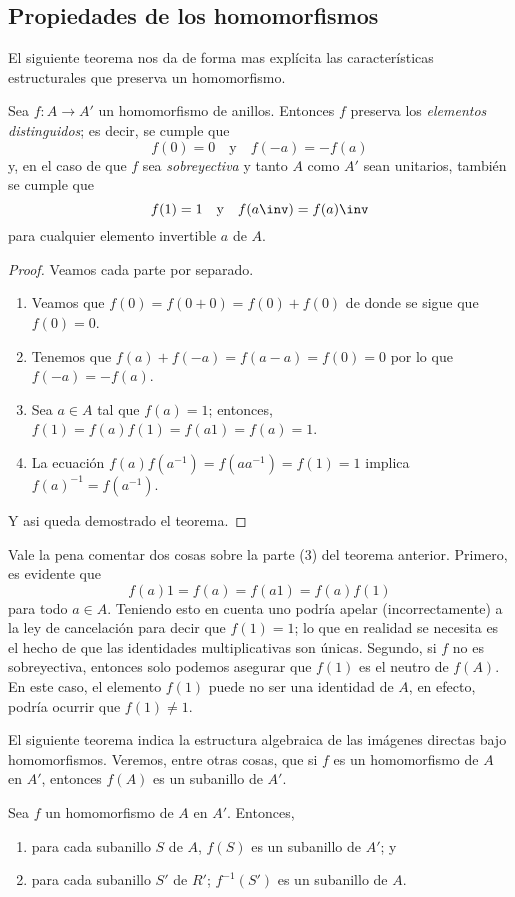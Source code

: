 \subsection{Propiedades de los homomorfismos}
El siguiente teorema nos da de forma mas explícita las características estructurales que preserva un homomorfismo.
\begin{teo} 
	Sea $f\colon A\to A'$ un homomorfismo de anillos. Entonces $f$ preserva los \textit{elementos distinguidos}; es decir, se cumple que
	\[ f(0) = 0 \quad \text{y} \quad f(-a) = -f(a)  \]
	y, en el caso de que $f$ sea \textit{sobreyectiva} y tanto $A$ como $A'$ sean unitarios, también se cumple que
	\[ f(1) = 1 \quad \text{y} \quad f(a\inv) = f(a)\inv \]
	para cualquier elemento invertible $a$ de $A$.
\end{teo} 
\begin{proof}

	Veamos cada parte por separado.
	\begin{enumerate} 
		\item Veamos que $f(0) = f(0+0) = f(0) + f(0)$ de donde se sigue que $f(0) = 0$.
		\item Tenemos que $f(a) + f(-a) = f(a-a) = f(0) = 0$ por lo que $f(-a) = -f(a)$.
		\item Sea $a\in A$ tal que $f(a)=1$; entonces, $f(1) = f(a)f(1) = f(a1) = f(a) = 1$.
		\item La ecuación $f(a)f(a^{-1}) = f(aa^{-1}) = f(1) = 1$ implica $f(a)^{-1} = f(a^{-1})$. 
	\end{enumerate}
	Y asi queda demostrado el teorema.
\end{proof}
Vale la pena comentar dos cosas sobre la parte (3) del teorema anterior. Primero, es evidente que
\[ f(a)1 = f(a) = f(a1) = f(a)f(1) \]
para todo $a\in A$. Teniendo esto en cuenta uno podría apelar (incorrectamente) a la ley de cancelación para decir que $f(1)=1$; lo que en realidad se necesita es el hecho de que las identidades multiplicativas son únicas. Segundo, si $f$ no es sobreyectiva, entonces solo podemos asegurar que $f(1)$ es el neutro de $f(A)$. En este caso, el elemento $f(1)$ puede no ser una identidad de $A$, en efecto, podría ocurrir que $f(1)\neq 1$.

El siguiente teorema indica la estructura algebraica de las imágenes directas bajo homomorfismos. Veremos, entre otras cosas, que si $ f $ es un homomorfismo de $ A $ en $ A'$, entonces $ f(A) $ es un subanillo de $ A' $.

\begin{teo}\label{teohomoinv}
	Sea $ f $ un homomorfismo de $ A $ en $ A' $. Entonces,
	\begin{enumerate}
		\item para cada subanillo $ S $ de $ A $, $ f(S) $ es un subanillo de $ A' $; y 
		\item para cada subanillo $ S' $ de $ R' $; $ f^{-1}(S') $ es un subanillo de $ A $.
	\end{enumerate}
\end{teo}

